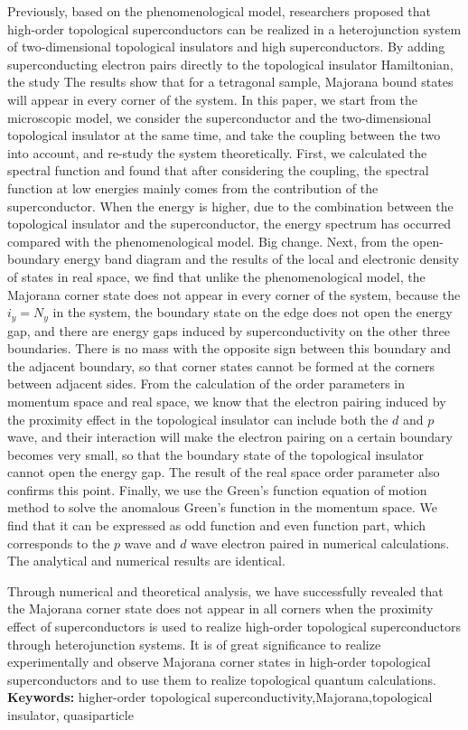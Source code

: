 Previously, based on the phenomenological model, researchers proposed that high-order topological superconductors can be realized in a heterojunction system of two-dimensional topological insulators and high superconductors. By adding superconducting electron pairs directly to the topological insulator Hamiltonian, the study The results show that for a tetragonal sample, Majorana bound states will appear in every corner of the system. In this paper, we start from the microscopic model, we consider the superconductor and the two-dimensional topological insulator at the same time, and take the coupling between the two into account, and re-study the system theoretically. First, we calculated the spectral function and found that after considering the coupling, the spectral function at low energies mainly comes from the contribution of the superconductor. When the energy is higher, due to the combination between the topological insulator and the superconductor, the energy spectrum has occurred compared with the phenomenological model. Big change. Next, from the open-boundary energy band diagram and the results of the local and electronic density of states in real space, we find that unlike the phenomenological model, the Majorana corner state does not appear in every corner of the system, because the $i_y=N_y$ in the system, the boundary state on the edge does not open the energy gap, and there are energy gaps induced by superconductivity on the other three boundaries. There is no mass with the opposite sign between this boundary and the adjacent boundary, so that corner states cannot be formed at the corners between adjacent sides.  From the calculation of the order parameters in momentum space and real space, we know that the electron pairing induced by the proximity effect in the topological insulator can include both the $d$ and  $p$ wave, and their interaction will make the electron pairing on a certain boundary becomes very small, so that the boundary state of the topological insulator cannot open the energy gap. The result of the real space order parameter also confirms this point. Finally, we use the Green's function equation of motion method to solve the anomalous Green's function in the momentum space. We find that it can be expressed as odd function and even function part, which corresponds to the $p$ wave and $d$ wave electron paired in numerical calculations. The analytical and numerical results are identical. 
 
 Through numerical and theoretical analysis, we have successfully revealed that the Majorana corner state does not appear in all corners when the proximity effect of superconductors is used to realize high-order topological superconductors through heterojunction systems. It is of great significance to realize experimentally and observe Majorana corner states in high-order topological superconductors and to use them to realize topological quantum calculations. \\
\noindent\textbf{ Keywords:} higher-order topological superconductivity,Majorana,topological insulator,
quasiparticle